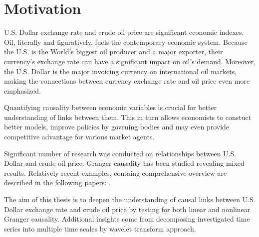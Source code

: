 \section{Motivation} \label{sec:motivation}

U.S. Dollar exchange rate and crude oil price are significant economic indexes.
Oil, literally and figuratively, fuels the contemporary economic system.
Because the U.S. is the World's biggest oil producer and a major exporter, their currency's exchange rate 
can have a significant impact on oil's demand. Moreover, the U.S. Dollar is the major invoicing currency
on international oil markets, making the connections between currency exchange rate and oil price even more
emphasized.

Quantifying causality between economic variables is crucial for better understanding of links between them.
This in turn allows economists to constuct better models, improve policies by govening bodies and may even 
provide competitive advantage for various market agents.

Significant number of research was conducted on relationships between U.S. Dollar and crude oil price.
Granger causality has been studied revealing mixed results. Relatively recent examples, containg comprehensive
overview are described in the following papers: \cite{2010-oil-dollar, 2012-benhmad, 2017-oil-dollar, 2020-beckmann}.

The aim of this thesis is to deepen the understanding of causal links between U.S. Dollar exchange rate
and crude oil price by testing for both linear and nonlinear Granger causality.
Additional insights come from decomposing investigated time series into multiple time scales by wavelet
transform approach.
